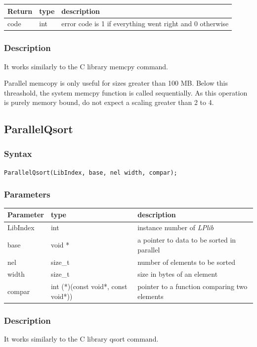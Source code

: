 \documentclass[a4paper,12pt]{article}
\begin{document}
\medskip

\noindent
\begin{tabular}{|m{2cm}|m{1.5cm}|m{10.5cm}|}
\hline
Return     & type   & description \\
\hline
code       & int    & error code is 1 if everything went right and 0 otherwise \\
\hline
\end{tabular}

\subsubsection*{Description}
It works similarly to the C library memcpy command.

Parallel memcopy is only useful for sizes greater than 100 MB. Below this threashold, the system memcpy function is called sequentially. As this operation is purely memory bound, do not expect a scaling greater than 2 to 4.


\subsection{ParallelQsort}

\subsubsection*{Syntax}
\tt{ParallelQsort(LibIndex, base, nel width, compar);}
\normalfont

\subsubsection*{Parameters}
\begin{tabular}{|m{2cm}|m{4cm}|m{8cm}|}
\hline
Parameter  & type   & description \\
\hline
LibIndex   & int    & instance number of \emph{LPlib} \\
\hline
base       & void * & a pointer to data to be sorted in parallel \\
\hline
nel        & size\_t & number of elements to be sorted \\
\hline
width      & size\_t & size in bytes of an element \\
\hline
compar     & int (*)(const void*, const void*)) & pointer to a function comparing two elements \\
\hline
\end{tabular}

\subsubsection*{Description}
It works similarly to the C library qsort command.
\end{document}
